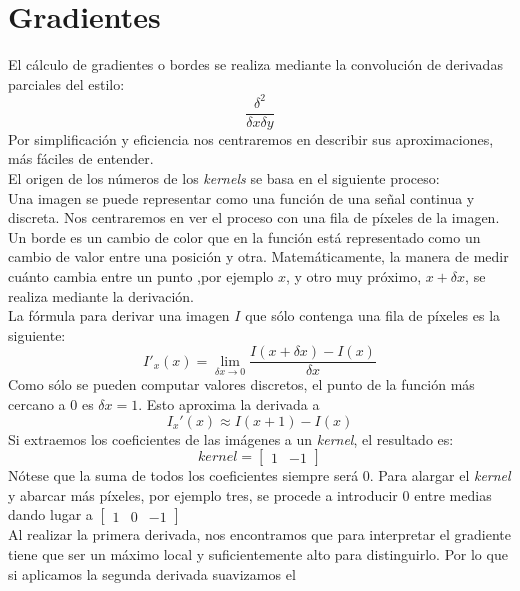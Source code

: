 \section{Gradientes}
El cálculo de gradientes o bordes se realiza mediante la convolución
de derivadas parciales del estilo:
\begin{equation*}
  \frac{\delta^{2}}{\delta x \delta y}
\end{equation*}
Por simplificación y eficiencia nos centraremos en describir sus
aproximaciones, más fáciles de entender. \\
El origen de los números de los \emph{kernels} se basa en el siguiente
proceso:\\
Una imagen se puede representar como una función de una señal continua y
discreta. Nos centraremos en ver el proceso con una fila de píxeles de
la imagen. Un borde es un cambio de color que en la función está
representado como un cambio de valor entre una posición y
otra. Matemáticamente, la manera de medir cuánto cambia entre un punto
,por ejemplo $x$, y otro muy próximo, $x + \delta x$, se realiza mediante la
derivación.\\
La fórmula para derivar una imagen $I$ que sólo contenga una fila de
píxeles es la siguiente:
\begin{equation*}
I'_x(x) = \lim_{\delta x \to 0}\frac{I(x+\delta x) - I(x)}{\delta x}
\end{equation*}
Como sólo se pueden computar valores discretos, el punto de la función
más cercano a $0$ es $\delta x = 1$. Esto aproxima la derivada a
\begin{equation*}
I_x'(x) \approx I(x + 1) - I(x)
\end{equation*}
Si extraemos los coeficientes de las imágenes a un \emph{kernel}, el
resultado es:
\begin{equation*}
kernel = \begin{bmatrix}
1 & -1
\end{bmatrix}
\end{equation*}
Nótese que la suma de todos los coeficientes siempre será $0$. Para
alargar el \emph{kernel} y abarcar más píxeles, por ejemplo
tres, se procede a introducir $0$ entre medias dando lugar a
$\begin{bmatrix} 1 & 0 & -1 \end{bmatrix}$ \\
Al realizar la primera derivada, nos encontramos que para interpretar
el gradiente tiene que ser un máximo local y suficientemente alto para
distinguirlo. Por lo que si aplicamos la segunda derivada suavizamos el
